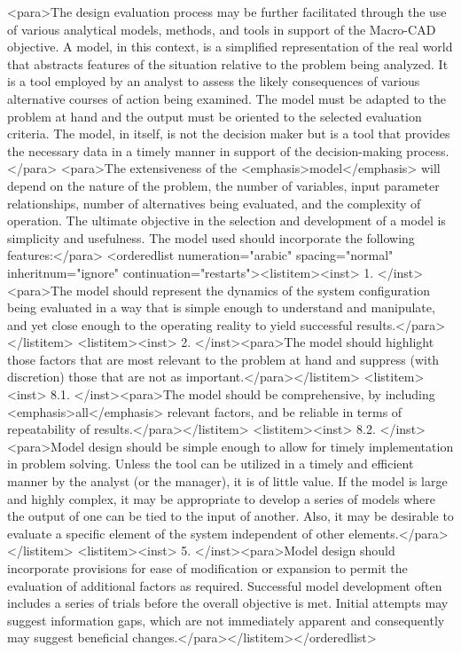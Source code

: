 <para>The design evaluation process may be further facilitated through the use of various analytical models, methods, and tools in support of the Macro-CAD objective. A model, in this context, is a simplified representation of the real world that abstracts features of the situation relative to the problem being analyzed. It is a tool employed by an analyst to assess the likely consequences of various alternative courses of action being examined. The model must be adapted to the problem at hand and the output must be oriented to the selected evaluation criteria. The model, in itself, is not the decision maker but is a tool that provides the necessary data in a timely manner in support of the decision-making process.</para>
<para>The extensiveness of the <emphasis>model</emphasis> will depend on the nature of the problem, the number of variables, input parameter relationships, number of alternatives being evaluated, and the complexity of operation. The ultimate objective in the selection and development of a model is simplicity and usefulness. The model used should incorporate the following features:</para>
<orderedlist numeration="arabic" spacing="normal" inheritnum="ignore" continuation="restarts"><listitem><inst>	1.	</inst><para>The model should represent the dynamics of the system configuration being evaluated in a way that is simple enough to understand and manipulate, and yet close enough to the operating reality to yield successful results.</para></listitem>
<listitem><inst>	2.	</inst><para>The model should highlight those factors that are most relevant to the problem at hand and suppress (with discretion) those that are not as important.</para></listitem>
<listitem><inst>	8.1.	</inst><para>The model should be comprehensive, by including <emphasis>all</emphasis> relevant factors, and be reliable in terms of repeatability of results.</para></listitem>
<listitem><inst>	8.2.	</inst><para>Model design should be simple enough to allow for timely implementation in problem solving. Unless the tool can be utilized in a timely and efficient manner by the analyst (or the manager), it is of little value. If the model is large and highly complex, it may be appropriate to develop a series of models where the output of one can be tied to the input of another. Also, it may be desirable to evaluate a specific element of the system independent of other elements.</para></listitem>
<listitem><inst>	5.	</inst><para>Model design should incorporate provisions for ease of modification or expansion to permit the evaluation of additional factors as required. Successful model development often includes a series of trials before the overall objective is met. Initial attempts may suggest information gaps, which are not immediately apparent and consequently may suggest beneficial changes.</para></listitem></orderedlist>
